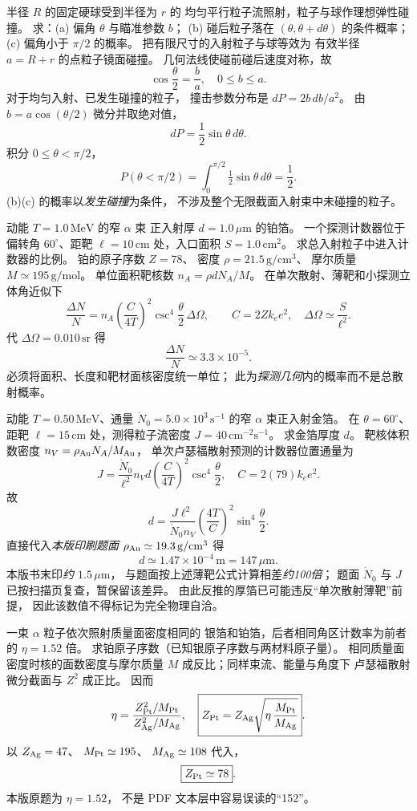 半径 $R$ 的固定硬球受到半径为 $r$ 的
均匀平行粒子流照射，粒子与球作理想弹性碰撞。
求：(a) 偏角 $\theta$ 与瞄准参数 $b$；
(b) 碰后粒子落在 $(\theta,\theta+d\theta)$ 的条件概率；
(c) 偏角小于 $\pi/2$ 的概率。
\exsolution
把有限尺寸的入射粒子与球等效为
有效半径 $a=R+r$ 的点粒子镜面碰撞。
几何法线使碰前碰后速度对称，故
\[
 \boxed{\cos\frac\theta2=\frac ba},\quad 0\le b\le a.
\]
对于均匀入射、已发生碰撞的粒子，
撞击参数分布是
$dP=2b\,db/a^2$。
由 $b=a\cos(\theta/2)$ 微分并取绝对值，
\[
 \boxed{dP=\frac12\sin\theta\,d\theta}.
\]
积分 $0\le\theta<\pi/2$，
\[
 \boxed{P(\theta<\pi/2)=
 \int_0^{\pi/2}\tfrac12\sin\theta\,d\theta=\frac12}.
\]
\excheck (b)(c) 的概率以\emph{发生碰撞}为条件，
不涉及整个无限截面入射束中未碰撞的粒子。

动能 $T=1.0\,\mathrm{MeV}$ 的窄 $\alpha$ 束
正入射厚 $d=1.0\,\mu\mathrm m$ 的铂箔。
一个探测计数器位于偏转角 $60^\circ$、距靶
$\ell=10\,\mathrm{cm}$ 处，入口面积
$S=1.0\,\mathrm{cm^2}$。
求总入射粒子中进入计数器的比例。
\exsolution
铂的原子序数 $Z=78$、
密度 $\rho=21.5\,\mathrm{g/cm^3}$、
摩尔质量 $M\simeq195\,\mathrm{g/mol}$。
单位面积靶核数
$n_A=\rho dN_A/M$。
在单次散射、薄靶和小探测立体角近似下
\[
 \frac{\Delta N}{N}=
 n_A\left(\frac C{4T}\right)^2
 \csc^4\frac\theta2\,\Delta\Omega,\qquad
 C=2Zk_ee^2,\quad \Delta\Omega\simeq\frac S{\ell^2}.
\]
代 $\Delta\Omega=0.010\,\mathrm{sr}$ 得
\[
 \boxed{\frac{\Delta N}{N}\simeq3.3\times10^{-5}}.
\]
\excheck 必须将面积、长度和靶材面核密度统一单位；
此为\emph{探测几何}内的概率而不是总散射概率。

动能 $T=0.50\,\mathrm{MeV}$、通量
$\dot N_0=5.0\times10^3\,\mathrm{s^{-1}}$
的窄 $\alpha$ 束正入射金箔。
在 $\theta=60^\circ$、距靶 $\ell=15\,\mathrm{cm}$
处，测得粒子流密度
$J=40\,\mathrm{cm^{-2}s^{-1}}$。
求金箔厚度 $d$。
\exsolution
靶核体积数密度
$n_V=\rho_{\rm Au}N_A/M_{\rm Au}$，
单次卢瑟福散射预测的计数器位置通量为
\[
 J=\frac{\dot N_0}{\ell^2}
 n_Vd\left(\frac C{4T}\right)^2
 \csc^4\frac\theta2,\quad C=2(79)k_ee^2.
\]
故
\[
 \boxed{d=\frac{J\ell^2}{\dot N_0n_V}
 \left(\frac{4T}{C}\right)^2
 \sin^4\frac\theta2}.
\]
直接代入\emph{本版印刷题面}
$\rho_{\rm Au}\simeq19.3\,\mathrm{g/cm^3}$ 得
\[
 \boxed{d\simeq1.47\times10^{-4}\,\mathrm m
 =147\,\mu\mathrm m}.
\]
\excheck 本版书末印\emph{约 $1.5\,\mu\mathrm m$}，
与题面按上述薄靶公式计算相差\emph{约100倍}；
题面 $\dot N_0$ 与 $J$ 已按扫描页复查，暂保留该差异。
由此反推的厚箔已可能违反“单次散射薄靶”前提，
因此该数值不得标记为完全物理自洽。

一束 $\alpha$ 粒子依次照射质量面密度相同的
银箔和铂箔，后者相同角区计数率为前者的
$\eta=1.52$ 倍。
求铂原子序数（已知银原子序数与两材料原子量）。
\exsolution
相同质量面密度时核的面数密度与摩尔质量
$M$ 成反比；同样束流、能量与角度下
卢瑟福散射微分截面与 $Z^2$ 成正比。
因而
\[
 \eta=\frac{Z_{\rm Pt}^2/M_{\rm Pt}}
 {Z_{\rm Ag}^2/M_{\rm Ag}},\quad
 \boxed{Z_{\rm Pt}=Z_{\rm Ag}
 \sqrt{\eta\,\frac{M_{\rm Pt}}{M_{\rm Ag}}}}.
\]
以 $Z_{\rm Ag}=47$、
$M_{\rm Pt}\simeq195$、
$M_{\rm Ag}\simeq108$ 代入，
\[
 \boxed{Z_{\rm Pt}\simeq78}.
\]
\excheck 本版原题为 $\eta=1.52$，
不是 PDF 文本层中容易误读的“152”。

